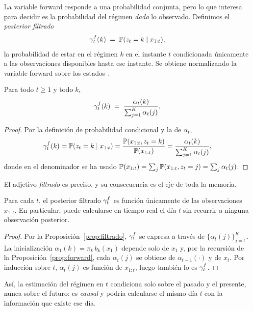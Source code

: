 La variable forward responde a una probabilidad conjunta, pero lo que interesa para decidir es la probabilidad del régimen \emph{dado} lo observado. Definimos el \emph{posterior filtrado}
\[
\gamma^{f}_t(k) \;=\; \mathbb{P}(z_t = k \mid x_{1:t}),
\]
la probabilidad de estar en el régimen $k$ en el instante $t$ condicionada únicamente a las observaciones disponibles hasta ese instante. Se obtiene normalizando la variable forward sobre los estados \cite{rabiner1989, bishop2006}.

\begin{proposicion}
\label{prop:filtrado}
Para todo $t \ge 1$ y todo $k$,
\[
\gamma^{f}_t(k) \;=\; \frac{\alpha_t(k)}{\sum_{j=1}^{K} \alpha_t(j)}.
\]
\end{proposicion}

\begin{proof}
Por la definición de probabilidad condicional y la de $\alpha_t$,
\[
\gamma^{f}_t(k) = \mathbb{P}(z_t = k \mid x_{1:t})
= \frac{\mathbb{P}(x_{1:t}, z_t = k)}{\mathbb{P}(x_{1:t})}
= \frac{\alpha_t(k)}{\sum_{j=1}^{K} \alpha_t(j)},
\]
donde en el denominador se ha usado $\mathbb{P}(x_{1:t}) = \sum_j \mathbb{P}(x_{1:t}, z_t = j) = \sum_j \alpha_t(j)$.
\end{proof}

El adjetivo \emph{filtrado} es preciso, y su consecuencia es el eje de toda la memoria.

\begin{corolario}
\label{cor:causal}
Para cada $t$, el posterior filtrado $\gamma^{f}_t$ es función únicamente de las observaciones $x_{1:t}$. En particular, puede calcularse en tiempo real el día $t$ sin recurrir a ninguna observación posterior.
\end{corolario}

\begin{proof}
Por la Proposición~\ref{prop:filtrado}, $\gamma^{f}_t$ se expresa a través de $\{\alpha_t(j)\}_{j=1}^{K}$. La inicialización $\alpha_1(k) = \pi_k\, b_k(x_1)$ depende solo de $x_1$ y, por la recursión de la Proposición~\ref{prop:forward}, cada $\alpha_{t}(j)$ se obtiene de $\alpha_{t-1}(\cdot)$ y de $x_t$. Por inducción sobre $t$, $\alpha_t(j)$ es función de $x_{1:t}$, luego también lo es $\gamma^{f}_t$.
\end{proof}

Así, la estimación del régimen en $t$ condiciona solo sobre el pasado y el presente, nunca sobre el futuro: es \emph{causal} y podría calcularse el mismo día $t$ con la información que existe ese día.

